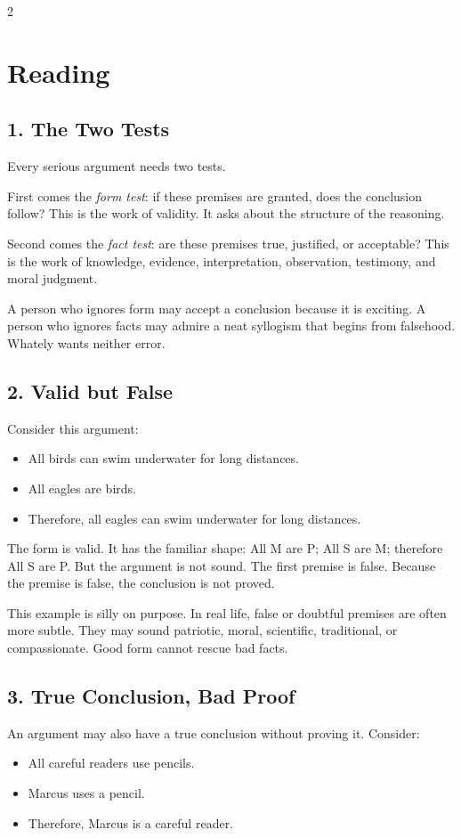 \documentclass[12pt]{article}
\begin{document}
\begin{multicols}{2}
\section*{Reading}

\subsection*{1. The Two Tests}
Every serious argument needs two tests.

First comes the \textit{form test}: if these premises are granted, does the conclusion follow? This is the work of validity. It asks about the structure of the reasoning.

Second comes the \textit{fact test}: are these premises true, justified, or acceptable? This is the work of knowledge, evidence, interpretation, observation, testimony, and moral judgment.

A person who ignores form may accept a conclusion because it is exciting. A person who ignores facts may admire a neat syllogism that begins from falsehood. Whately wants neither error.

\subsection*{2. Valid but False}
Consider this argument:
\begin{itemize}[leftmargin=*]
\item All birds can swim underwater for long distances.
\item All eagles are birds.
\item Therefore, all eagles can swim underwater for long distances.
\end{itemize}

The form is valid. It has the familiar shape: All M are P; All S are M; therefore All S are P. But the argument is not sound. The first premise is false. Because the premise is false, the conclusion is not proved.

This example is silly on purpose. In real life, false or doubtful premises are often more subtle. They may sound patriotic, moral, scientific, traditional, or compassionate. Good form cannot rescue bad facts.

\subsection*{3. True Conclusion, Bad Proof}
An argument may also have a true conclusion without proving it. Consider:
\begin{itemize}[leftmargin=*]
\item All careful readers use pencils.
\item Marcus uses a pencil.
\item Therefore, Marcus is a careful reader.
\end{itemize}


\end{multicols}
\end{document}
